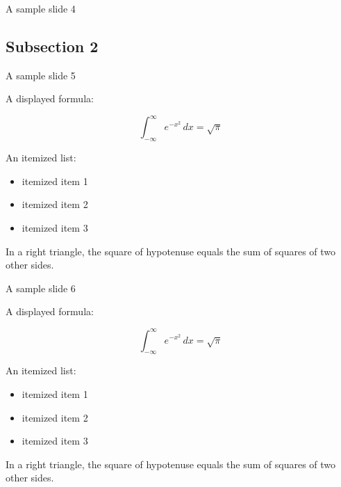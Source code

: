 \documentclass[final,serif,hyperref={pdfpagelabels=false}]{beamer}
\begin{document}
{\begin{frame}{A sample slide 4}
\end{frame}

\subsection{Subsection 2}

\begin{frame}{A sample slide 5}

A displayed formula:

\[
  \int_{-\infty}^\infty e^{-x^2} \, dx = \sqrt{\pi}
\]

An itemized list:

\begin{itemize}
  \item itemized item 1
  \item itemized item 2
  \item itemized item 3
\end{itemize}

\begin{theorem}
  In a right triangle, the square of hypotenuse equals
  the sum of squares of two other sides.
\end{theorem}

\end{frame}

\begin{frame}{A sample slide 6}

A displayed formula:

\[
  \int_{-\infty}^\infty e^{-x^2} \, dx = \sqrt{\pi}
\]

An itemized list:

\begin{itemize}
  \item itemized item 1
  \item itemized item 2
  \item itemized item 3
\end{itemize}

\begin{theorem}
  In a right triangle, the square of hypotenuse equals
  the sum of squares of two other sides.
\end{theorem}

\end{frame}

}
\end{document}
